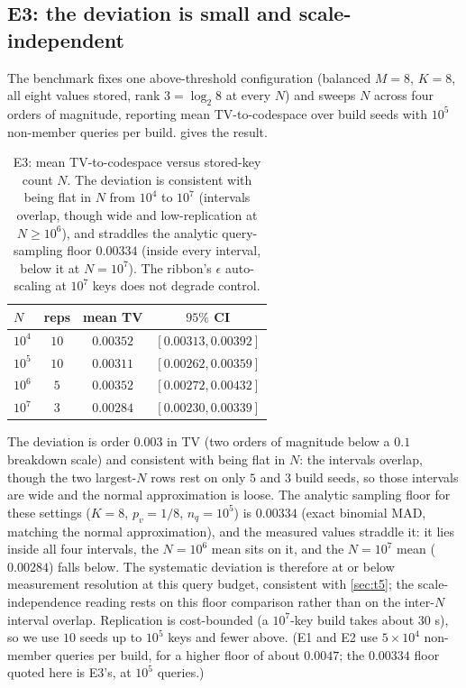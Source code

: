 \documentclass[11pt]{article}
\theoremstyle{definition}
\theoremstyle{plain}
\theoremstyle{remark}
\begin{document}
\subsection{E3: the deviation is small and scale-independent}

The benchmark fixes one above-threshold configuration (balanced $M = 8$, $K = 8$, all
eight values stored, rank $3 = \log_2 8$ at every $N$) and sweeps $N$ across four orders of
magnitude, reporting mean TV-to-codespace over build seeds with $10^5$ non-member queries
per build.  gives the result.

\begin{table}[t]
  \centering
  \caption{E3: mean TV-to-codespace versus stored-key count $N$. The deviation is consistent
  with being flat in $N$ from $10^4$ to $10^7$ (intervals overlap, though wide and
  low-replication at $N \ge 10^6$), and straddles the analytic query-sampling floor $0.00334$
  (inside every interval, below it at $N = 10^7$). The ribbon's $\epsilon$ auto-scaling at
  $10^7$ keys does not degrade control.}
  \label{tab:e3}
  \begin{tabular}{lccc}
    \toprule
    $N$ & reps & mean TV & $95\%$ CI \\
    \midrule
    $10^4$ & $10$ & $0.00352$ & $[0.00313, 0.00392]$ \\
    $10^5$ & $10$ & $0.00311$ & $[0.00262, 0.00359]$ \\
    $10^6$ & $5$  & $0.00352$ & $[0.00272, 0.00432]$ \\
    $10^7$ & $3$  & $0.00284$ & $[0.00230, 0.00339]$ \\
    \bottomrule
  \end{tabular}
\end{table}

The deviation is order $0.003$ in TV (two orders of magnitude below a $0.1$ breakdown
scale) and consistent with being flat in $N$: the intervals overlap, though the two
largest-$N$ rows rest on only $5$ and $3$ build seeds, so those intervals are wide and the
normal approximation is loose. The analytic sampling floor for these
settings ($K = 8$, $p_v = 1/8$, $n_q = 10^5$) is $0.00334$ (exact binomial MAD, matching
the normal approximation), and the measured values straddle it: it lies inside all four
intervals, the $N = 10^6$ mean sits on it, and the $N = 10^7$ mean ($0.00284$) falls
below. The systematic deviation is therefore at or below measurement resolution at this
query budget, consistent with \cref{sec:t5}; the scale-independence reading rests on this
floor comparison rather than on the inter-$N$ interval overlap. Replication is cost-bounded
(a $10^7$-key build takes about $30$ s), so we use $10$ seeds up to $10^5$ keys and fewer
above. (E1 and E2 use $5 \times 10^4$ non-member queries per build, for a higher floor of
about $0.0047$; the $0.00334$ floor quoted here is E3's, at $10^5$ queries.)
\end{document}
